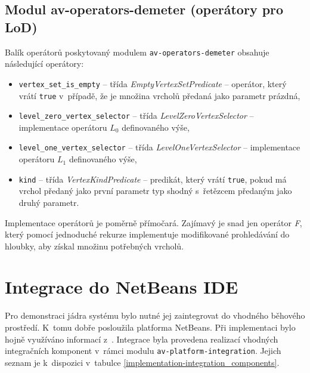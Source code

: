 \subsection{Modul av-operators-demeter (operátory pro LoD)}
Balík operátorů poskytovaný modulem \verb+av-operators-demeter+ obsahuje následující operátory:

\begin{itemize}
\item \verb+vertex_set_is_empty+ -- třída \emph{EmptyVertexSetPredicate} -- operátor, který vrátí \verb+true+ v~případě, že je množina vrcholů předaná jako parametr prázdná,
\item \verb+level_zero_vertex_selector+ -- třída \emph{LevelZeroVertexSelector} -- implementace operátoru $L_0$ definovaného výše,
\item \verb+level_one_vertex_selector+ -- třída \emph{LevelOneVertexSelector} -- implementace operátoru $L_1$ definovaného výše,
\item \verb+kind+ -- třída \emph{VertexKindPredicate} -- predikát, který vrátí \verb+true+, pokud má vrchol předaný jako první parametr typ shodný s~řetězcem předaným jako druhý parametr.
\end{itemize}

Implementace operátorů je poměrně přímočará. Zajímavý je snad jen operátor \emph{F}, který pomocí jednoduché rekurze implementuje modifikované prohledávání do hloubky, aby získal množinu potřebných vrcholů.

\section{Integrace do NetBeans IDE}

Pro demonstraci jádra systému bylo nutné jej zaintegrovat do vhodného běhového prostředí. K~tomu dobře posloužila platforma NetBeans. Při implementaci bylo hojně využíváno informací z~\cite{netbeans_platform}. Integrace byla provedena realizací vhodných integračních komponent v~rámci modulu \verb+av-platform-integration+. Jejich seznam je k~dispozici v~tabulce \ref{implementation-integration_components}.

